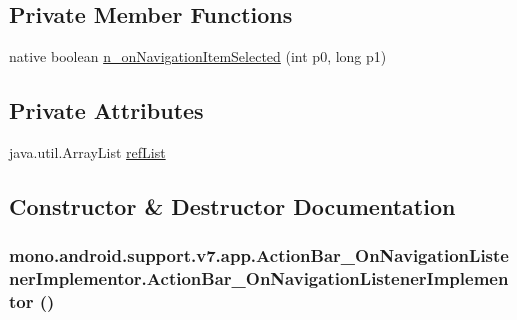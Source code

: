 \subsection*{Private Member Functions}
\begin{CompactItemize}
\item 
native boolean \hyperlink{classmono_1_1android_1_1support_1_1v7_1_1app_1_1_action_bar___on_navigation_listener_implementor_3beecccd4417f861d448445bc26f2e77}{n\_\-onNavigationItemSelected} (int p0, long p1)
\end{CompactItemize}
\subsection*{Private Attributes}
\begin{CompactItemize}
\item 
java.util.ArrayList \hyperlink{classmono_1_1android_1_1support_1_1v7_1_1app_1_1_action_bar___on_navigation_listener_implementor_cd717ee1cf80832735017e10eca80acf}{refList}
\end{CompactItemize}


\subsection{Constructor \& Destructor Documentation}
\hypertarget{classmono_1_1android_1_1support_1_1v7_1_1app_1_1_action_bar___on_navigation_listener_implementor_4729a43ecf3aeace36396b9eb52f83c9}{
\subsubsection[{ActionBar\_\-OnNavigationListenerImplementor}]{\setlength{\rightskip}{0pt plus 5cm}mono.android.support.v7.app.ActionBar\_\-OnNavigationListenerImplementor.ActionBar\_\-OnNavigationListenerImplementor ()}}
\label{classmono_1_1android_1_1support_1_1v7_1_1app_1_1_action_bar___on_navigation_listener_implementor_4729a43ecf3aeace36396b9eb52f83c9}





